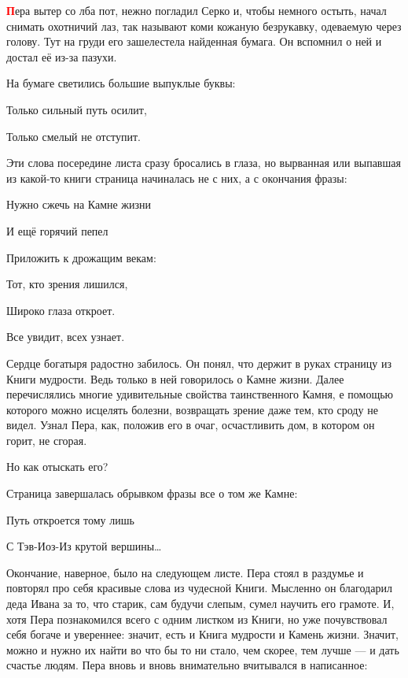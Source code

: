 \documentclass[oneside,final,14pt]{extreport}
\begin{document}
		
	
	\lettrine[findent=0pt]{\textbf{\textcolor{red}{П}}}{}ера вытер со лба пот, нежно погладил Серко и, чтобы немного остыть, начал снимать охотничий лаз, так называют коми кожаную безрукавку, одеваемую через голову. Тут на груди его зашелестела найденная бумага. Он вспомнил о ней и достал её из-за пазухи.
	
	На бумаге светились большие выпуклые буквы:
	
	
	
	
\qquad \qquad \qquad \qquad 	Только сильный путь осилит,

\qquad \qquad \qquad \qquad 	Только смелый не отступит.
	
	
	
	
	Эти слова посередине листа сразу бросались в глаза, но вырванная или выпавшая из какой-то книги страница начиналась не с них, а с окончания фразы:
	
	
	
	
\qquad \qquad \qquad \qquad 	Нужно сжечь на Камне жизни
	
\qquad \qquad \qquad \qquad 	И ещё горячий пепел
	
\qquad \qquad \qquad \qquad 	Приложить к дрожащим векам:
	
\qquad \qquad \qquad \qquad 	Тот, кто зрения лишился,
	
\qquad \qquad \qquad \qquad 	Широко глаза откроет.
	
\qquad \qquad \qquad \qquad 	Все увидит, всех узнает.
	
	
	
	
	Сердце богатыря радостно забилось. Он понял, что держит в руках страницу из Книги мудрости. Ведь только в ней говорилось о Камне жизни. Далее перечислялись многие удивительные свойства таинственного Камня, е помощью которого можно исцелять болезни, возвращать зрение даже тем, кто сроду не видел. Узнал Пера, как, положив его в очаг, осчастливить дом, в котором он горит, не сгорая.
	
	Но как отыскать его?
	
	Страница завершалась обрывком фразы все о том же Камне:
	
	
	
	
\qquad \qquad \qquad \qquad 	Путь откроется тому лишь
	
\qquad \qquad \qquad \qquad 	С Тэв-Иоз-Из крутой вершины…
	
	
	
	
	Окончание, наверное, было на следующем листе. Пера стоял в раздумье и повторял про себя красивые слова из чудесной Книги. Мысленно он благодарил деда Ивана за то, что старик, сам будучи слепым, сумел научить его грамоте. И, хотя Пера познакомился всего с одним листком из Книги, но уже почувствовал себя богаче и увереннее: значит, есть и Книга мудрости и Камень жизни. Значит, можно и нужно их найти во что бы то ни стало, чем скорее, тем лучше — и дать счастье людям. Пера вновь и вновь внимательно вчитывался в написанное:
	
\end{document}
